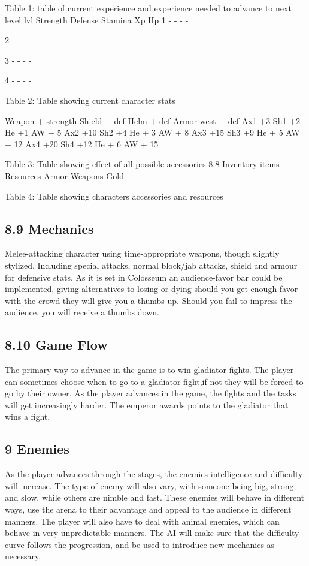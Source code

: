 \documentclass{article}
\begin{document}
\begin{titlepage}
{Table 1:  table of current experience and experience needed to advance to next level
lvl
Strength
Defense
Stamina
Xp
Hp
1
-
-
-
-
 
2
-
-
-
-
 
3
-
-
-
-
 
4
-
-
-
-
 

Table 2: Table showing current character stats
 
Weapon + strength
Shield + def
Helm + def
Armor west + def
Ax1 +3
Sh1 +2
He +1
AW + 5
Ax2 +10
Sh2 +4
He +  3
AW + 8
Ax3 +15
Sh3 +9
He + 5
AW + 12
Ax4 +20
Sh4 +12
He + 6
AW + 15

Table 3: Table showing effect of all possible accessories
8.8 Inventory items
Resources
Armor
Weapons
Gold
-
-
-
-
-
-
-
-
-
-
-
-

Table 4: Table showing characters accessories and resources

\subsection{ 8.9 Mechanics }
Melee-attacking character using time-appropriate weapons, though slightly stylized. Including special attacks, normal block/jab attacks, shield and armour for defensive stats. As it is set in Colosseum an audience-favor bar could be implemented, giving alternatives to losing or dying should you get enough favor with the crowd they will give you a thumbs up. Should you fail to impress the audience, you will receive a thumbs down.

\subsection{ 8.10 Game Flow }
The primary way to advance in the game is to win gladiator fights. The player can sometimes choose when to go to a gladiator fight,if not they will be forced to go by their owner. As the player advances in the game, the fights and the tasks will get increasingly harder. The emperor awards points to the gladiator that wins a fight. 

\subsection{ 9 Enemies }
As the player advances through the stages, the enemies intelligence and difficulty will increase. The type of enemy will also vary, with someone being big, strong and slow, while others are nimble and fast. These enemies will behave in different ways, use the arena to their advantage and appeal to the audience in different manners. The player will also have to deal with animal enemies, which can behave in very unpredictable manners. The AI will make sure that the difficulty curve follows the progression, and be used to introduce new mechanics as necessary. 

}
\end{titlepage}
\end{document}
